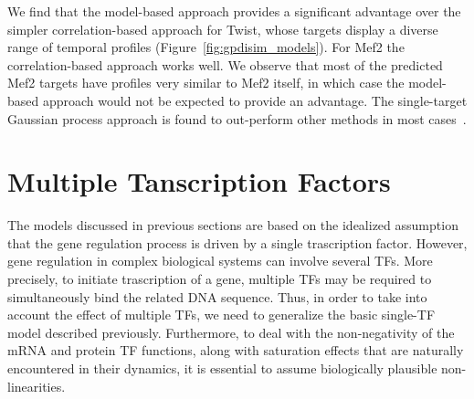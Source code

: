 \documentclass{article}
\begin{document}
We find that the model-based approach provides a significant advantage
over the simpler correlation-based approach for Twist, whose targets
display a diverse range of temporal profiles
(Figure~\ref{fig:gpdisim_models}). For Mef2 the correlation-based
approach works well. We observe that most of the predicted Mef2
targets have profiles very similar to Mef2 itself, in which case the
model-based approach would not be expected to provide an advantage. The
single-target Gaussian process approach is found to out-perform other
methods in most cases~\citep{Honkela:modelbased10}.


\section{Multiple Tanscription Factors}

The models discussed in previous sections are based on the idealized 
assumption that the gene regulation process is driven 
by a single trascription factor. However, gene regulation 
in complex biological systems can involve several TFs.
More precisely, to initiate trascription of a gene, 
multiple TFs may be required to simultaneously 
bind the related DNA sequence. Thus,  
in order to take into account the effect of 
multiple TFs, we need to generalize the basic
single-TF model described previously. Furthermore, to deal with   
the non-negativity of the mRNA and protein TF functions,
along with saturation effects that are naturally encountered in 
their dynamics, it is essential to assume biologically plausible 
non-linearities. 
   
\end{document}
